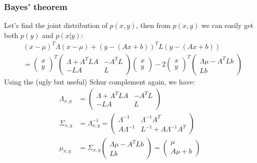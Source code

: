 \documentclass{beamer}
\begin{document}
\begin{frame}
    \frametitle{Bayes' theorem}
    Let's find the joint distribution of $p(x,y)$, then from $p(x,y)$ we can easily get both $p(y)$ and $p(x|y)$:
    \begin{align*}
        &(x-\mu)^{T}\Lambda(x-\mu)+(y-(Ax+b))^{T}L(y-(Ax+b)) \\
        &=\begin{pmatrix}
            x \\
            y
        \end{pmatrix}^{T}
        \begin{pmatrix}
            \Lambda+A^{T}LA&-A^{T}L \\
            -LA&L
        \end{pmatrix}
        \begin{pmatrix}
            x \\
            y
        \end{pmatrix}
        -2\begin{pmatrix}
            x \\
            y
        \end{pmatrix}^{T}
        \begin{pmatrix}
            \Lambda\mu-A^{T}Lb \\
            Lb
        \end{pmatrix}
    \end{align*}
    Using the (ugly but useful) Schur complement again, we have:
    \begin{align*}
        \Lambda_{x,y}&=\begin{pmatrix}
            \Lambda+A^{T}LA&-A^{T}L \\
            -LA&L
        \end{pmatrix} \\
        \Sigma_{x,y}&=\Lambda_{x,y}^{-1}=\begin{pmatrix}
            \Lambda^{-1}&\Lambda^{-1}A^{T} \\
            A\Lambda^{-1}&L^{-1}+A\Lambda^{-1}A^{T}
        \end{pmatrix} \\
        \mu_{x,y}&=\Sigma_{x,y}\begin{pmatrix}
            \Lambda\mu-A^{T}Lb \\
            Lb
        \end{pmatrix}=\begin{pmatrix}
            \mu \\
            A\mu+b
        \end{pmatrix}
    \end{align*}
\end{frame}
\end{document}
